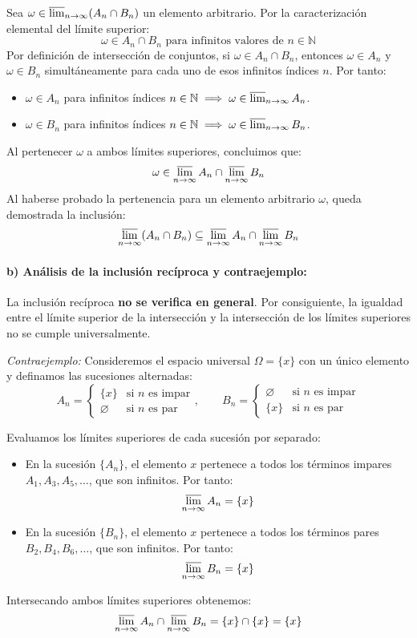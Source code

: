 \begin{problema}
Sea $\omega \in \varlimsup_{n \to \infty} (A_n \cap B_n)$ un elemento arbitrario. Por la caracterización elemental del límite superior:
\[
    \omega \in A_n \cap B_n \text{ para infinitos valores de } n \in \mathbb{N}
\]
Por definición de intersección de conjuntos, si $\omega \in A_n \cap B_n$, entonces $\omega \in A_n$ y $\omega \in B_n$ simultáneamente para cada uno de esos infinitos índices $n$. Por tanto:
\begin{itemize}
    \item $\omega \in A_n$ para infinitos índices $n \in \mathbb{N} \implies \omega \in \varlimsup_{n \to \infty} A_n$.
    \item $\omega \in B_n$ para infinitos índices $n \in \mathbb{N} \implies \omega \in \varlimsup_{n \to \infty} B_n$.
\end{itemize}
Al pertenecer $\omega$ a ambos límites superiores, concluimos que:
\[
    \omega \in \varlimsup_{n \to \infty} A_n \cap \varlimsup_{n \to \infty} B_n
\]
Al haberse probado la pertenencia para un elemento arbitrario $\omega$, queda demostrada la inclusión:
\[
    \varlimsup_{n \to \infty} (A_n \cap B_n) \subseteq \varlimsup_{n \to \infty} A_n \cap \varlimsup_{n \to \infty} B_n
\]

\paragraph{b) Análisis de la inclusión recíproca y contraejemplo:}
La inclusión recíproca \textbf{no se verifica en general}. Por consiguiente, la igualdad entre el límite superior de la intersección y la intersección de los límites superiores no se cumple universalmente.

\textit{Contraejemplo:}
Consideremos el espacio universal $\Omega = \{x\}$ con un único elemento y definamos las sucesiones alternadas:
\[
    A_n = \begin{cases} \{x\} & \text{si } n \text{ es impar} \\ \varnothing & \text{si } n \text{ es par} \end{cases}, \qquad B_n = \begin{cases} \varnothing & \text{si } n \text{ es impar} \\ \{x\} & \text{si } n \text{ es par} \end{cases}
\]

Evaluamos los límites superiores de cada sucesión por separado:
\begin{itemize}
    \item En la sucesión $\{A_n\}$, el elemento $x$ pertenece a todos los términos impares $A_1, A_3, A_5, \dots$, que son infinitos. Por tanto:
    \[
        \varlimsup_{n \to \infty} A_n = \{x\}
    \]
    \item En la sucesión $\{B_n\}$, el elemento $x$ pertenece a todos los términos pares $B_2, B_4, B_6, \dots$, que son infinitos. Por tanto:
    \[
        \varlimsup_{n \to \infty} B_n = \{x\}
    \]
\end{itemize}
Intersecando ambos límites superiores obtenemos:
\[
    \varlimsup_{n \to \infty} A_n \cap \varlimsup_{n \to \infty} B_n = \{x\} \cap \{x\} = \{x\}
\]


\end{problema}

